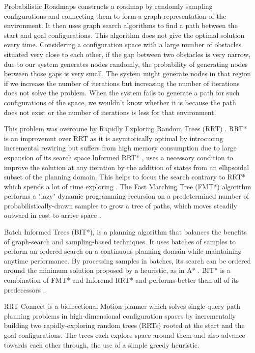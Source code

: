 \documentclass[12pt]{report}
\begin{document}
Probabilistic Roadmaps \cite{508439} constructs a roadmap by randomly sampling configurations and connecting them to form a graph representation of the environment. It then uses graph search algorithms to find a path between the start and goal configurations. This algorithm does not give the optimal solution every time. Considering a configuration space with a large number of obstacles situated very close to each other, if the gap between two obstacles is very narrow, due to our system generates nodes randomly, the probability of generating nodes between those gaps is very small. The system might generate nodes in that region if we increase the number of iterations but increasing the number of iterations does not solve the problem.
When the system fails to generate a path for such configurations of the space, we wouldn’t know whether it is because the path does not exist or the number of iterations is less for that environment.

This problem was overcome by Rapidly Exploring Random Trees (RRT) . RRT* is an improvemnt over RRT as it is asymtotically optimal by introcucing incremental rewiring\cite{6942976} but suffers from high memory consumption due to large expansion of its search space.\cite{noreen2016optimal}Informed RRT* , uses a necessary condition to improve the solution at any iteration by the addition of states from an ellipsoidal subset of the planning domain. \cite{6942976} This helps to focus the search contrary to RRT* which spends a lot of time exploring . The Fast Marching Tree (FMT*) algorithm performs a "lazy" dynamic programming recursion on a predetermined number of probabilistically-drawn samples to grow a tree of paths, which moves steadily outward in cost-to-arrive space \cite{janson2015fast}.

Batch Informed Trees (BIT*), is a planning algorithm that balances the benefits of graph-search and sampling-based techniques. It uses batches of samples to perform an ordered search on a continuous planning domain while maintaining anytime performance. By processing samples in batches, its search can be ordered around the minimum solution proposed by a heuristic, as in A* \cite{7139620}. BIT* is a combination of FMT* and Inforemd RRT* and performs better than all of its predecessors . 

RRT Connect is a bidirectional Motion planner which solves single-query path planning problems in high-dimensional configuration spaces by incrementally building two rapidly-exploring random trees (RRTs) rooted at the start and the goal configurations. The trees each explore space around them and also advance towards each other through, the use of a simple greedy heuristic\cite{844730}.
\end{document}
